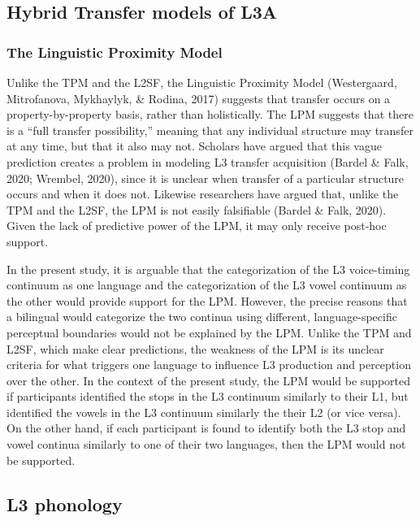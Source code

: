 \documentclass[
  english,
  man]{apa6}
\begin{document}
\hypertarget{hybrid-transfer-models-of-l3a}{%
\subsection{Hybrid Transfer models of L3A}\label{hybrid-transfer-models-of-l3a}}

\hypertarget{the-linguistic-proximity-model}{%
\subsubsection{The Linguistic Proximity Model}\label{the-linguistic-proximity-model}}

Unlike the TPM and the L2SF, the Linguistic Proximity Model (Westergaard, Mitrofanova, Mykhaylyk, \& Rodina, 2017) suggests that transfer occurs on a property-by-property basis, rather than holistically.
The LPM suggests that there is a ``full transfer possibility,'' meaning that any individual structure may transfer at any time, but that it also may not.
Scholars have argued that this vague prediction creates a problem in modeling L3 transfer acquisition (Bardel \& Falk, 2020; Wrembel, 2020), since it is unclear when transfer of a particular structure occurs and when it does not.
Likewise researchers have argued that, unlike the TPM and the L2SF, the LPM is not easily falsifiable (Bardel \& Falk, 2020).
Given the lack of predictive power of the LPM, it may only receive post-hoc support.

In the present study, it is arguable that the categorization of the L3 voice-timing continuum as one language and the categorization of the L3 vowel continuum as the other would provide support for the LPM. However, the precise reasons that a bilingual would categorize the two continua using different, language-specific perceptual boundaries would not be explained by the LPM. Unlike the TPM and L2SF, which make clear predictions, the weakness of the LPM is its unclear criteria for what triggers one language to influence L3 production and perception over the other. In the context of the present study, the LPM would be supported if participants identified the stops in the L3 continuum similarly to their L1, but identified the vowels in the L3 continuum similarly the their L2 (or vice versa). On the other hand, if each participant is found to identify both the L3 stop and vowel continua similarly to one of their two languages, then the LPM would not be supported.

\hypertarget{l3-phonology}{%
\subsection{L3 phonology}\label{l3-phonology}}
\end{document}
